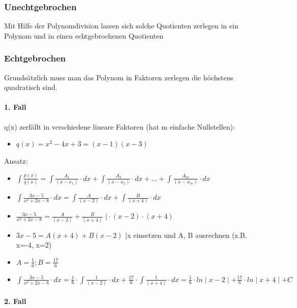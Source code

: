 \subsubsection*{Unechtgebrochen}

Mit Hilfe der Polynomdivision lassen sich solche Quotienten zerlegen
in ein Polynom und in einen echtgebrochenen Quotienten


\subsubsection*{Echtgebrochen}

Grundsätzlich muss man das Polynom in Faktoren zerlegen die höchstens
quadratisch sind.


\paragraph*{1. Fall}

q(x) zerfällt in verschiedene lineare Faktoren (hat m einfache Nullstellen):
\begin{itemize}
\item $q(x)=x^{2}-4x+3=(x-1)(x-3)$
\end{itemize}
Ansatz:
\begin{itemize}
\item $\int\frac{p(x)}{q(x)}=\int\frac{A_{1}}{(x-x_{1})}\cdot dx+\int\frac{A_{2}}{(x-x_{2})}\cdot dx+...+\int\frac{A_{m}}{(x-x_{m})}\cdot dx$
\item $\int\frac{3x-5}{x^{2}+2x-8}\cdot dx=\int\frac{A}{(x-2)}\cdot dx+\int\frac{B}{(x+4)}\cdot dx$
\item $\frac{3x-5}{x^{2}+2x-8}=\frac{A}{(x-2)}+\frac{B}{(x+4)}$ $\mid\cdot(x-2)\cdot(x+4)$
\item $3x-5=A(x+4)+B(x-2)$ $\mid$x einsetzen und A, B ausrechnen (z.B.
x=-4, x=2)
\item $A=\frac{1}{6};B=\frac{17}{6}$
\item $\int\frac{3x-5}{x^{2}+2x-8}\cdot dx=\frac{1}{6}\cdot\int\frac{1}{(x-2)}\cdot dx+\frac{17}{6}\cdot\int\frac{1}{(x+4)}\cdot dx=\frac{1}{6}\cdot ln\mid x-2\mid+\frac{17}{6}\cdot ln\mid x+4\mid+C$
\end{itemize}

\paragraph*{2. Fall}

